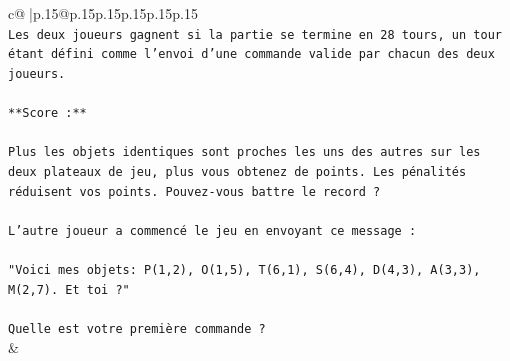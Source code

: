 \documentclass{article}
\begin{document}
{\begin{supertabular}{c@{$\;$}|p{.15\linewidth}@{}p{.15\linewidth}p{.15\linewidth}p{.15\linewidth}p{.15\linewidth}p{.15\linewidth}}
{{{\\ 
\texttt{Les deux joueurs gagnent si la partie se termine en 28 tours, un tour étant défini comme l'envoi d'une commande valide par chacun des deux joueurs.} \\
\\ 
\texttt{**Score :**} \\
\\ 
\texttt{Plus les objets identiques sont proches les uns des autres sur les deux plateaux de jeu, plus vous obtenez de points. Les pénalités réduisent vos points. Pouvez{-}vous battre le record ?} \\
\\ 
\texttt{L'autre joueur a commencé le jeu en envoyant ce message :} \\
\\ 
\texttt{"Voici mes objets: P(1,2), O(1,5), T(6,1), S(6,4), D(4,3), A(3,3), M(2,7). Et toi ?"} \\
\\ 
\texttt{Quelle est votre première commande ?} \\
            }
        }
    }
    & \\ \\


\end{supertabular}}
\end{document}
